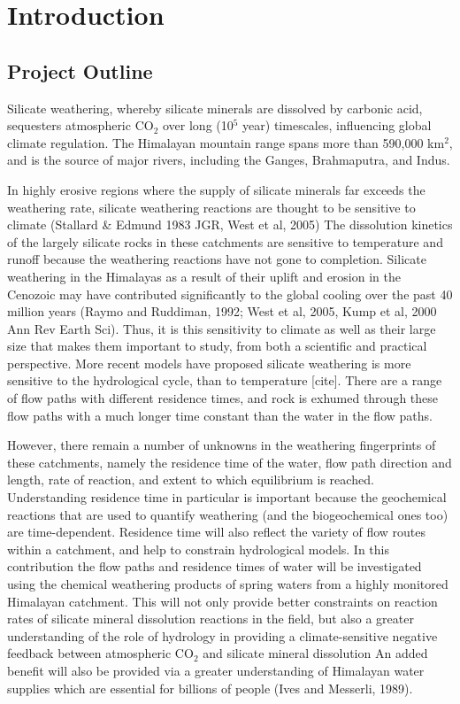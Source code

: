 
\section{Introduction}


\subsection{Project Outline}

Silicate weathering, whereby silicate minerals are dissolved by carbonic acid, 
sequesters atmospheric CO$_2$ over long (10$^5$ year) timescales, influencing global climate regulation.
The Himalayan mountain range spans more than 590,000 km$^2$, and is the source of major rivers, including the Ganges, Brahmaputra, and Indus. 


\bsk

In highly erosive regions where the supply of silicate minerals far exceeds the weathering rate, silicate weathering reactions are thought to be sensitive to climate (Stallard \& Edmund 1983 JGR, West et al, 2005) The dissolution kinetics of the largely silicate rocks in these catchments are sensitive to temperature and runoff because the weathering reactions have not gone to completion. Silicate weathering in the Himalayas as a result of their uplift and erosion in the Cenozoic may have contributed significantly to the global 
cooling over the past 40 million years %
(Raymo and Ruddiman, 1992; West et al, 2005, Kump et al, 2000 Ann Rev Earth Sci). 
Thus, it is this sensitivity to climate as well as their large size that makes them important to study, from both a scientific and practical perspective. More recent models have proposed silicate weathering is more sensitive to the hydrological cycle, than to temperature [cite]. There are a range of flow paths with different residence times, and rock is exhumed through these flow paths with a much longer time constant than the water in the flow paths.

\bsk

However, there remain a number of unknowns in the weathering fingerprints of these catchments, namely the residence time of the water,
flow path direction and length, rate of reaction, and extent to which equilibrium is reached.
Understanding residence time in particular is important because the geochemical reactions that are used to quantify weathering 
(and the biogeochemical ones too) are time-dependent.
Residence time will also reflect the variety of flow routes within a catchment, and help to constrain hydrological models. In this contribution the flow paths and residence times of water will be investigated using the chemical weathering products of spring waters from a highly monitored Himalayan catchment. This will not only provide better constraints on reaction rates of silicate mineral dissolution reactions in the field, but also a greater understanding of the role of hydrology in providing a climate-sensitive negative feedback between atmospheric CO$_2$ and silicate mineral dissolution
An added benefit will also be provided via a greater understanding of Himalayan water supplies which are essential for billions of people (Ives and Messerli, 1989). 

